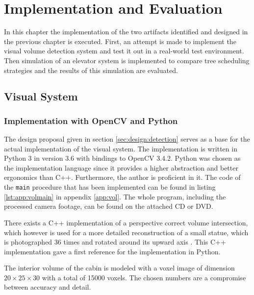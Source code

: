 \chapter{Implementation and Evaluation}
\label{chap:impl}

In this chapter the implementation of the two artifacts identified and designed in the previous chapter is executed.
First, an attempt is made to implement the visual volume detection system and test it out in a real-world test environment.
Then simulation of an elevator system is implemented to compare tree scheduling strategies and the results of this simulation are evaluated.

\section{Visual System}
\subsection{Implementation with OpenCV and Python}

The design proposal given in section \ref{sec:design:detection} serves as a base for the actual implementation of the visual system.
The implementation is written in Python 3 in version 3.6 \autocite[][]{python2018python366}
with bindings to OpenCV 3.4.2.
Python was chosen as the implementation language since it provides a higher abstraction and better ergonomics than C++.
Furthermore, the author is proficient in it.
The code of the \texttt{main} procedure that has been implemented can be found in listing \ref{lst:app:volmain} in appendix \ref{app:vol}.
The whole program, including the processed camera footage, can be found on the attached CD or DVD.

There exists a C++ implementation of a perspective correct volume intersection, which however is used for a more detailed reconstruction of a small statue, which is photographed 36 times and rotated around its upward axis \autocite[][]{xocoatzin2013voxelcarving}.
This C++ implementation gave a first reference for the implementation in Python.

The interior volume of the cabin is modeled with a voxel image of dimension $ 20 \times 25 \times 30 $ with a total of 15000 voxels.
The chosen numbers are a compromise between accuracy and detail.

